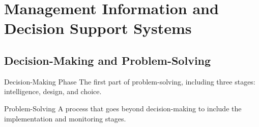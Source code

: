 \documentclass[\main/notes.tex]{subfiles}
\begin{document}
	\setcounter{chapter}{7}
	\chapter{Management Information and Decision Support Systems}
		\section{Decision-Making and Problem-Solving}
			\begin{definition}{Decision-Making Phase}
				The first part of problem-solving, including three stages: intelligence, design, and choice.
			\end{definition}
			\begin{definition}{Problem-Solving}
				A process that goes beyond decision-making to include the implementation and monitoring stages.
			\end{definition}
\end{document}
